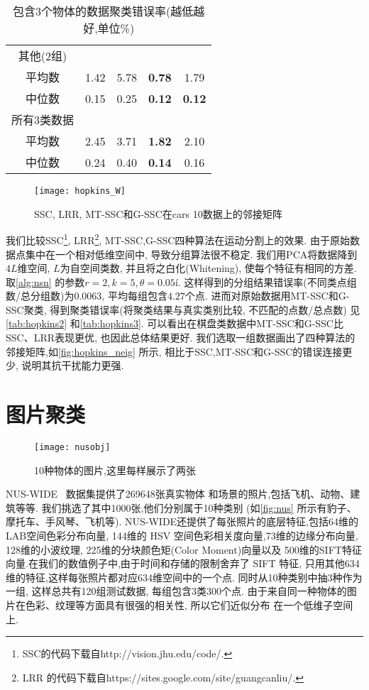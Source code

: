 \begin{table}[!htb]
\begin{tabular}{|c|c|c|c|c|}
	其他(2组)  &      &      &               &               \\
	平均数     & 1.42 & 5.78 & \textbf{0.78} & 1.79          \\
	中位数     & 0.15 & 0.25 & \textbf{0.12} & \textbf{0.12} \\ \hline
	所有3类数据  &      &      &               &               \\
	平均数     & 2.45 & 3.71 & \textbf{1.82} & 2.10 \\
    中位数     & 0.24 & 0.40 & \textbf{0.14}  & 0.16  \\ \hline
  \end{tabular}
  \caption{包含3个物体的数据聚类错误率(越低越好,单位\%)}
  \label{tab:hopkins3}
\end{table}

\begin{figure}[tb]
  \centering
  \texttt{[image: hopkins\_W]}
  \caption{SSC, LRR, MT-SSC和G-SSC在cars 10数据上的邻接矩阵}
  \label{fig:hopkins_neig}
\end{figure}
我们比较SSC\footnote{SSC的代码下载自http://vision.jhu.edu/code/.},
LRR\footnote{LRR 的代码下载自https://sites.google.com/site/guangcanliu/.},
MT-SSC,G-SSC四种算法在运动分割上的效果.
由于原始数据点集中在一个相对低维空间中, 导致分组算法很不稳定.
我们用PCA将数据降到\(4L\)维空间, \(L\)为自空间类数, 并且将之白化(Whitening),
使每个特征有相同的方差. 
取\autoref{alg:nsn} 的参数\(r=2, k=5, \theta=0.05\)í.
这样得到的分组结果错误率(不同类点组数/总分组数)为\(0.0063\),
平均每组包含\(4.27\)个点.
进而对原始数据用MT-SSC和G-SSC聚类,
得到聚类错误率(将聚类结果与真实类别比较, 不匹配的点数/总点数)
见\autoref{tab:hopkins2} 和\autoref{tab:hopkins3}. 
可以看出在棋盘类数据中MT-SSC和G-SSC比SSC、LRR表现更优, 也因此总体结果更好.
我们选取一组数据画出了四种算法的邻接矩阵,如\autoref{fig:hopkins_neig} 所示,
相比于SSC,MT-SSC和G-SSC的错误连接更少, 说明其抗干扰能力更强.

\section{图片聚类}
\begin{figure}[htb]
  \centering
  \texttt{[image: nusobj]}
  \caption{10种物体的图片,这里每样展示了两张}
  \label{fig:nus}
\end{figure}
NUS-WIDE~\cite{chua2009NUS} 数据集提供了269648张真实物体
和场景的照片,包括飞机、动物、建筑等等.
我们挑选了其中1000张,他们分别属于10种类别
(如\autoref{fig:nus} 所示有豹子、摩托车、手风琴、飞机等).
NUS-WIDE还提供了每张照片的底层特征,包括64维的LAB空间色彩分布向量,
144维的 HSV 空间色彩相关度向量,73维的边缘分布向量,
128维的小波纹理, 225维的分块颜色矩(Color Moment)向量以及
500维的SIFT特征向量.在我们的数值例子中,由于时间和存储的限制舍弃了
SIFT 特征, 只用其他634维的特征,这样每张照片都对应634维空间中的一个点.
同时从10种类别中抽3种作为一组, 这样总共有120组测试数据, 每组包含3类300个点.
由于来自同一种物体的图片在色彩、纹理等方面具有很强的相关性, 所以它们近似分布
在一个低维子空间上.

